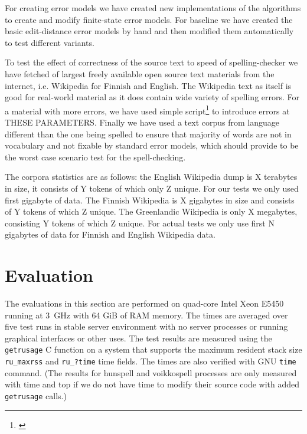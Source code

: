 \documentclass[11pt]{article}
\begin{document}
For creating error models we have created new implementations of the algorithms
to create and modify finite-state error models. For baseline we have created
the basic edit-distance error models by hand and then modified them
automatically to test different variants.

To test the effect of correctness of the source text to speed of
spelling-checker we have fetched of largest freely available open source text
materials from the internet, i.e. Wikipedia for Finnish and English. The
Wikipedia text as itself is good for real-world material as it does contain
wide variety of spelling errors. For a material with more errors, we have used
simple script\footnote{\url{}} to introduce errors at THESE PARAMETERS. Finally
we have used a text corpus from language different than the one being spelled
to ensure that majority of words are not in vocabulary and not fixable by
standard error models, which should provide to be the worst case scenario test
for the spell-checking.

The corpora statistics are as follows: the English Wikipedia dump is X terabytes
in size, it consists of Y tokens of which only Z unique. For our tests we
only used first gigabyte of data. The Finnish Wikipedia is X gigabytes in size
and consists of Y tokens of which Z unique. The Greenlandic Wikipedia is only
X megabytes, consisting Y tokens of which Z unique. For actual tests we only use
first N gigabytes of data for Finnish and English Wikipedia data.

\section{Evaluation}
\label{sec:evaluation}

The evaluations in this section are performed on quad-core Intel Xeon E5450
running at 3~GHz with 64 GiB of RAM memory. The times are averaged over five
test runs in stable server environment with no server processes or running
graphical interfaces or other uses. The test results are measured using the
\texttt{getrusage} C function on a system that supports the maximum resident
stack size \texttt{ru\_maxrss} and \texttt{ru\_?time} time fields. The times
are also verified with GNU \texttt{time} command. (The results for hunspell and
voikkospell processes are only measured with time and top if we do not have
time to modify their source code with added \texttt{getrusage} calls.)
\end{document}
